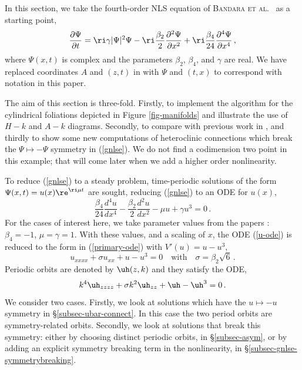 \documentclass[10pt]{article}
\begin{document}
In this section, we take the fourth-order NLS equation of \textsc{Bandara et al.}~\cite{bgbk21,bgbk23,bgbk25} as a starting point,
%
\begin{equation}\label{gnlse}
  \frac{\partial \Psi}{\partial t} = \ri \gamma|\Psi|^2\Psi -\ri\frac{\beta_2}{2}
  \frac{\partial^2\Psi}{\partial x^2} + \ri \frac{\beta_4}{24}\frac{\partial^4\Psi}{\partial x^4}\,,
\end{equation}
%
where $\Psi(x,t)$ is complex and the parameters $\beta_2$, $\beta_4$, and $\gamma$
are real. We have replaced coordinates $A$ and $(z,t)$ in \cite{bgbk21,bgbk23,bgbk25}
with $\Psi$ and $(t,x)$ to correspond with notation in this paper.

The aim of this section is three-fold. Firstly, to implement the algorithm for the cylindrical foliations depicted in Figure \ref{fig-manifolds} and illustrate the use of $H-k$ and $A-k$ diagrams. Secondly, to compare with previous work in \cite{bgbk21,bgbk23,bgbk25}, and thirdly to show some new computations of heteroclinic connections which break the $\Psi\mapsto -\Psi$ symmetry in (\ref{gnlse}). We do not find a codimension two point in this example; that will come later when we add a
higher order nonlinearity. 

To reduce (\ref{gnlse}) to a steady problem, time-periodic solutions of the form $\Psi(x,t) = u(x)\re^{\ri\mu t}$ are sought, reducing (\ref{gnlse}) to an ODE for $u(x)$,
%
\begin{equation}\label{u-ode}
  \frac{\beta_4}{24} \frac{d^4u}{dx^4} - \frac{\beta_2}{2}\frac{d^2u}{dx^2} - \mu u + \gamma u^3 = 0 \,.
\end{equation}
%
For the cases of interest here, we take parameter values from the papers \cite{bgbk21,bgbk23,bgbk25}: $\beta_4=-1$, $\mu=\gamma=1$. With
these values, and a scaling of $x$, the ODE (\ref{u-ode}) is reduced to the form
in (\ref{primary-ode}) with $V'(u)=u-u^3$,
%
  \begin{equation}\label{cubic-SH-eqn}
    u_{xxxx} + \sigma u_{xx} + u - u^3 = 0\quad\mbox{with}\quad
\sigma=\beta_2\sqrt{6} \,.
  \end{equation}
  Periodic orbits are denoted by $\uh(z,k)$ and they satisfy the ODE,
  \begin{equation}\label{per-eqn-nls}
  k^4\uh_{zzzz}+\sigma k^2\uh_{zz} + \uh - \uh^3 = 0 \,.
  \end{equation}
  We consider two cases.  Firstly, we look at solutions which have the $u\mapsto -u$ symmetry in \S\ref{subsec-ubar-connect}.  In this case the two period orbits are symmetry-related orbits.  Secondly, we look at solutions that break this symmetry: either by choosing distinct periodic orbits, in \S\ref{subsec-asym}, or by adding an explicit symmetry breaking term in the nonlinearity, in \S\ref{subsec-gnlse-symmetrybreaking}.
  
\end{document}
